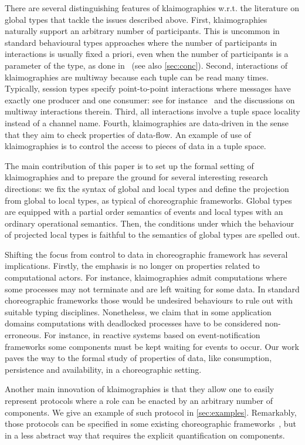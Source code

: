 There are several distinguishing features of klaimographies w.r.t.
the literature on global types that tackle the issues described above.
%
First, klaimographies naturally support an arbitrary number of
participants.
%
This is uncommon in standard behavioural types approaches where the
number of participants in interactions is usually fixed a priori, even
when the number of participants is a parameter of the type, as done
in~\cite{ydbh10} (see also \cref{sec:conc}).
%
Second, interactions of klaimographies are multiway because each tuple
can be read many times.
%
Typically, session types specify point-to-point interactions where
messages have exactly one producer and one consumer:
%
see for instance~\cite{cdp12} and the discussions on multiway
interactions therein.
%
Third, all interactions involve a tuple space locality instead of a
channel name.
%
Fourth, klaimographies are data-driven in the sense that they
aim to check properties of data-flow.
%
An example of use of klaimographies is to control the access to pieces
of data in a tuple space.

The main contribution of this paper is to set up the formal setting of
klaimographies and to prepare the ground for several interesting
research directions: we fix the syntax of global and local types and
define the projection from global to local types, as typical of
choreographic frameworks.  Global types are equipped with a partial
order semantics of events and local types with an ordinary operational
semantics. Then, the conditions under which the behaviour of projected
local types is faithful to the semantics of global types are spelled
out.

Shifting the focus from control to data in choreographic framework has
several implications.
%
Firstly, the emphasis is no longer on properties related to
computational actors.
%
For instance, klaimographies admit computations where some processes
may not terminate and are left waiting for some data.
%
In standard choreographic frameworks those would be undesired behaviours
to rule out with suitable typing disciplines.
%
Nonetheless, we claim that in some application domains computations with
deadlocked processes have to be considered non-erroneous.
%
For instance, in reactive systems based on event-notification
frameworks some  components must be kept waiting for
events to occur.
%
Our work paves the way to the formal study of properties of data, like consumption, persistence and availability, in a choreographic setting.

Another main innovation of klaimographies is that they allow one to
easily represent protocols where a role can be enacted by an arbitrary
number of components.
%
We give an example of such protocol in \cref{sec:examples}.
%
Remarkably, those protocols can be specified in some existing
choreographic frameworks~\cite{ydbh10,chjny19}, but in a less abstract way
that requires the explicit quantification on components.

